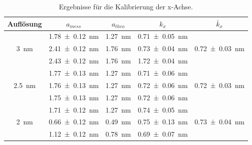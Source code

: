 \begin{table}[H]
	\renewcommand{\arraystretch}{1.5}
	\centering
	\begin{tabular}{|c|c|c|c|c|}
		\hline
		Auflösung & $a_{mess}$ & $a_{theo}$ & $k_x$ & $\bar{k}_x$ \\
		\hline
		\multirow{3}{*}{\SI{3}{nm}} & \SI{1.78+-0.12}{nm} & \SI{1.27}{nm} & \SI{0.71+-0.05}{nm} & \multirow{3}{*}{\SI{0.72+-0.03}{nm}} \\
		 & \SI{2.41+-0.12}{nm} & \SI{1.76}{nm} & \SI{0.73+-0.04}{nm} & \\
		 & \SI{2.43+-0.12}{nm} & \SI{1.76}{nm} & \SI{1.72+-0.04}{nm} & \\
		\hline
		\multirow{3}{*}{\SI{2,5}{nm}} & \SI{1.77+-0.13}{nm} & \SI{1.27}{nm} & \SI{0.71+-0.06}{nm} & \multirow{3}{*}{\SI{0.72+-0.03}{nm}} \\
		 & \SI{1.76+-0.13}{nm} & \SI{1.27}{nm} & \SI{0.72+-0.06}{nm} & \\
		 & \SI{1.75+-0.13}{nm} & \SI{1.27}{nm} & \SI{0.72+-0.06}{nm} & \\
		\hline
		\multirow{3}{*}{\SI{2}{nm}} & \SI{1.71+-0.12}{nm} & \SI{1.27}{nm} & \SI{0.74+-0.05}{nm} & \multirow{3}{*}{\SI{0.73+-0.04}{nm}} \\
		 & \SI{0.66+-0.12}{nm} & \SI{0.49}{nm} & \SI{0.75+-0.13}{nm} & \\
		 & \SI{1.12+-0.12}{nm} & \SI{0.78}{nm} & \SI{0.69+-0.07}{nm} & \\
		\hline
	\end{tabular}
	\caption{Ergebnisse für die Kalibrierung der x-Achse.}
	\label{tab:calibX}
\end{table}

